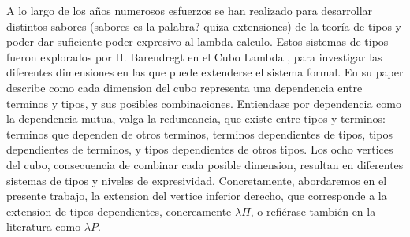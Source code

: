 \documentclass[a4paper,12pt]{report}
\theoremstyle{definition}
\theoremstyle{plain}
\theoremstyle{remark}
\begin{document}
A lo largo de los años numerosos esfuerzos se han realizado para desarrollar distintos sabores (sabores es la palabra? quiza extensiones) de la teoría de tipos y poder dar suficiente poder expresivo al lambda calculo. Estos sistemas de tipos fueron explorados por H. Barendregt en el Cubo Lambda \citep{barendregt1991}, para investigar las diferentes dimensiones en las que puede extenderse el sistema formal. En su paper describe como cada dimension del cubo representa una dependencia entre terminos y tipos, y sus posibles combinaciones.
\newline
\newline
Entiendase por dependencia como la dependencia mutua, valga la reduncancia, que existe entre tipos y terminos: terminos que dependen de otros terminos, terminos dependientes de tipos, tipos dependientes de terminos, y tipos dependientes de otros tipos. Los ocho vertices del cubo, consecuencia de combinar cada posible dimension, resultan en diferentes sistemas de tipos y niveles de expresividad. Concretamente, abordaremos en el presente trabajo, la extension del vertice inferior derecho, que corresponde a la extension de tipos dependientes, concreamente $\lambda\Pi$, o refiérase también en la literatura como $\lambda P$.
\newline
\begin{center}
\end{center}
\end{document}
